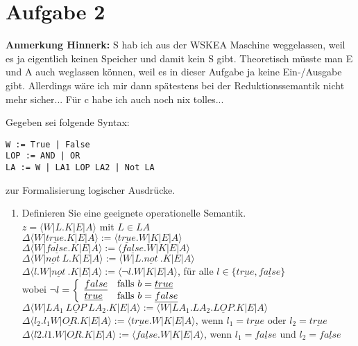 \documentclass[ngerman,a4paper]{report}
\begin{document}
\section*{Aufgabe 2}
\textbf{Anmerkung Hinnerk:} S hab ich aus der WSKEA Maschine weggelassen, weil es ja eigentlich keinen Speicher und damit kein S gibt. Theoretisch müsste man E und A auch weglassen können, weil es in dieser Aufgabe ja keine Ein-/Ausgabe gibt. Allerdings wäre ich mir dann spätestens bei der Reduktionssemantik nicht mehr sicher...
Für c habe ich auch noch nix tolles...

Gegeben sei folgende Syntax:
\begin{lstlisting}
W := True | False
LOP := AND | OR
LA := W | LA1 LOP LA2 | Not LA
\end{lstlisting}
zur Formalisierung logischer Ausdrücke.
\begin{enumerate}
\item Definieren Sie eine geeignete operationelle Semantik.\\
$z=\langle W|L.K|E|A\rangle$ mit $L \in LA$\\

$\Delta\langle W|\underline{true}.K|E|A\rangle:= \langle \underline{true}.W|K|E|A\rangle$\\
$\Delta\langle W|\underline{false}.K|E|A\rangle:= \langle \underline{false}.W|K|E|A\rangle$\\
$\Delta\langle W|\underline{not}\  L.K|E|A\rangle:= \langle W|L.\underline{not}\ .K|E|A\rangle$\\
$\Delta\langle l.W|\underline{not}\ .K|E|A\rangle:= \langle \neg l.W|K|E|A\rangle$, für alle $l\in \{\underline{true},\underline{false}\}$\\
wobei $\neg l = \left\lbrace\begin{array}{l l}
\underline{false}& \text{falls } b=\underline{true}\\
\underline{true}& \text{falls } b=\underline{false}\\
\end{array}\right.$\\
$\Delta\langle W|LA_1\ \underline{LOP}\ LA_2.K|E|A\rangle:= \langle W|LA_1.LA_2.\underline{LOP}.K|E|A\rangle$\\
$\Delta\langle l_2.l_1W|\underline{OR}.K|E|A\rangle:= \langle \underline{true}.W|K|E|A\rangle$, wenn $l_1=\underline{true}$ oder $l_2=\underline{true}$\\
$\Delta\langle l2.l1.W|\underline{OR}.K|E|A\rangle:= \langle \underline{false}.W|K|E|A\rangle$, wenn $l_1=\underline{false}$ und $l_2=\underline{false}$\\


\end{enumerate}
\end{document}
